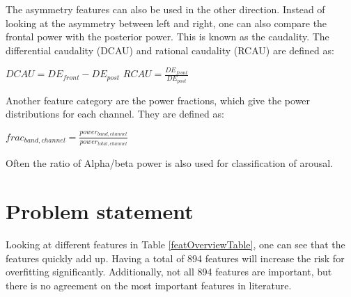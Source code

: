 \documentclass[12pt,journal,compsoc]{IEEEtran}
\newcommand{\npar}{\par \vspace{2.3ex plus 0.3ex minus 0.3ex}}
\begin{document}
The asymmetry features can also be used in the other direction\cite{GivenPaper}. Instead of looking at the asymmetry between left and right, one can also compare the frontal power with the posterior power. This is known as the caudality. The differential caudality (DCAU) and rational caudality (RCAU) are defined as:
\begin{center}
$DCAU = DE_{front} - DE_{post}$
$RCAU = \frac{DE_{front}}{DE_{post}}$
\end{center}

\npar

Another feature category are the power fractions, which give the power distributions for each channel\citep{ExtendedPaper}. They are defined as:
\begin{center}
$frac_{band,channel} = \frac{power_{band,channel}}{power_{total,channel}}$
\end{center}
Often the ratio of Alpha/beta power is also used for classification of arousal\citep{ref4}.

\section{Problem statement}\label{problem}
Looking at different features in Table \ref{featOverviewTable}, one can see that the features quickly add up. Having a total of 894 features will increase the risk for overfitting significantly\citep{rfPaper}. Additionally, not all 894 features are important, but there is no agreement on the most important features in literature. 
\end{document}
